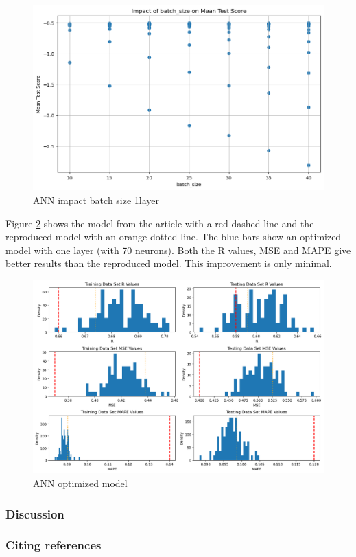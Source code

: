 \documentclass{article}
\begin{document}
\begin{figure}
	\centering
	\includegraphics[width=\linewidth]{figures/ANN_impact_batchsize_1layer.png}
	\caption{ANN impact batch size 1layer}
	\label{fig:ANN-impact-batchsize-1layer}
\end{figure}

Figure \ref{fig:ANN-optimized-model} shows the model from the article with a red dashed line and the reproduced model with an orange dotted line. The blue bars show an optimized model with one layer (with 70 neurons). Both the R values, MSE and MAPE give better results than the reproduced model. This improvement is only minimal.


\begin{figure}
	\centering
	\includegraphics[width=\linewidth]{figures/ANN_optimized_model.png}
	\caption{ANN optimized model}
	\label{fig:ANN-optimized-model}
\end{figure}




\subsubsection{Discussion}



\subsubsection{Citing references}




\end{document}
